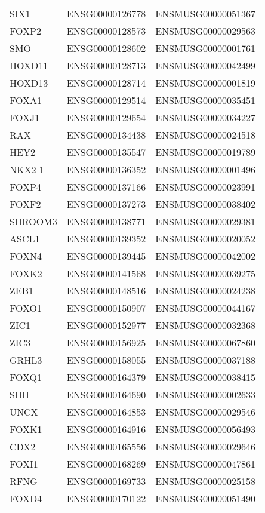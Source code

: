 \begin{longtable}{lll}
    SIX1 & ENSG00000126778 & ENSMUSG00000051367 \\
    FOXP2 & ENSG00000128573 & ENSMUSG00000029563 \\
    SMO & ENSG00000128602 & ENSMUSG00000001761 \\
    HOXD11 & ENSG00000128713 & ENSMUSG00000042499 \\
    HOXD13 & ENSG00000128714 & ENSMUSG00000001819 \\
    FOXA1 & ENSG00000129514 & ENSMUSG00000035451 \\
    FOXJ1 & ENSG00000129654 & ENSMUSG00000034227 \\
    RAX & ENSG00000134438 & ENSMUSG00000024518 \\
    HEY2 & ENSG00000135547 & ENSMUSG00000019789 \\
    NKX2-1 & ENSG00000136352 & ENSMUSG00000001496 \\
    FOXP4 & ENSG00000137166 & ENSMUSG00000023991 \\
    FOXF2 & ENSG00000137273 & ENSMUSG00000038402 \\
    SHROOM3 & ENSG00000138771 & ENSMUSG00000029381 \\
    ASCL1 & ENSG00000139352 & ENSMUSG00000020052 \\
    FOXN4 & ENSG00000139445 & ENSMUSG00000042002 \\
    FOXK2 & ENSG00000141568 & ENSMUSG00000039275 \\
    ZEB1 & ENSG00000148516 & ENSMUSG00000024238 \\
    FOXO1 & ENSG00000150907 & ENSMUSG00000044167 \\
    ZIC1 & ENSG00000152977 & ENSMUSG00000032368 \\
    ZIC3 & ENSG00000156925 & ENSMUSG00000067860 \\
    GRHL3 & ENSG00000158055 & ENSMUSG00000037188 \\
    FOXQ1 & ENSG00000164379 & ENSMUSG00000038415 \\
    SHH & ENSG00000164690 & ENSMUSG00000002633 \\
    UNCX & ENSG00000164853 & ENSMUSG00000029546 \\
    FOXK1 & ENSG00000164916 & ENSMUSG00000056493 \\
    CDX2 & ENSG00000165556 & ENSMUSG00000029646 \\
    FOXI1 & ENSG00000168269 & ENSMUSG00000047861 \\
    RFNG & ENSG00000169733 & ENSMUSG00000025158 \\
    FOXD4 & ENSG00000170122 & ENSMUSG00000051490 \\

\end{longtable}

